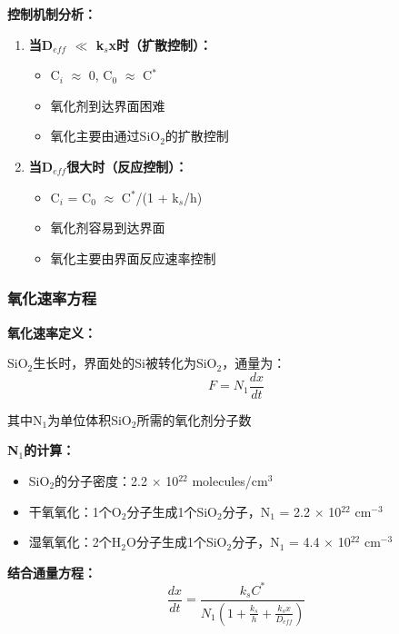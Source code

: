 \documentclass[UTF8,12pt,a4paper]{ctexart}
\begin{document}
\textbf{控制机制分析：}

\begin{enumerate}
    \item \textbf{当D$_{eff}$ $\ll$ k$_s$x时（扩散控制）：}
    \begin{itemize}
        \item C$_i$ $\approx$ 0, C$_0$ $\approx$ C$^*$
        \item 氧化剂到达界面困难
        \item 氧化主要由通过SiO$_2$的扩散控制
    \end{itemize}
    
    \item \textbf{当D$_{eff}$很大时（反应控制）：}
    \begin{itemize}
        \item C$_i$ = C$_0$ $\approx$ C$^*$/(1 + k$_s$/h)
        \item 氧化剂容易到达界面
        \item 氧化主要由界面反应速率控制
    \end{itemize}
\end{enumerate}

\subsubsection{氧化速率方程}

\textbf{氧化速率定义：}

SiO$_2$生长时，界面处的Si被转化为SiO$_2$，通量为：
\begin{equation}
F = N_1 \frac{dx}{dt}
\end{equation}

其中N$_1$为单位体积SiO$_2$所需的氧化剂分子数

\textbf{N$_1$的计算：}
\begin{itemize}
    \item SiO$_2$的分子密度：2.2 $\times$ 10$^{22}$ molecules/cm$^3$
    \item 干氧氧化：1个O$_2$分子生成1个SiO$_2$分子，N$_1$ = 2.2 $\times$ 10$^{22}$ cm$^{-3}$
    \item 湿氧氧化：2个H$_2$O分子生成1个SiO$_2$分子，N$_1$ = 4.4 $\times$ 10$^{22}$ cm$^{-3}$
\end{itemize}

\textbf{结合通量方程：}
\begin{equation}
\frac{dx}{dt} = \frac{k_s C^*}{N_1(1 + \frac{k_s}{h} + \frac{k_s x}{D_{eff}})}
\end{equation}
\end{document}
